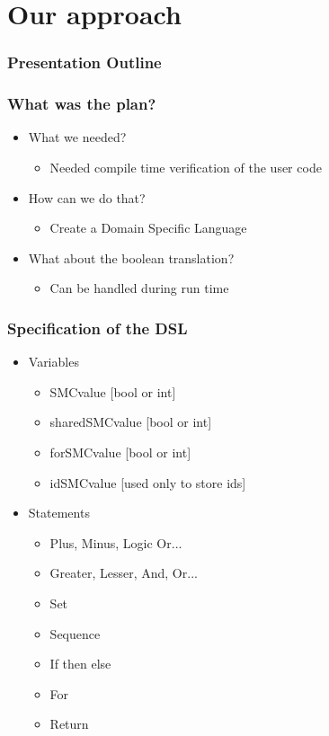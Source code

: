 \documentclass{beamer}
\begin{document}
\section{Our approach}
\begin{frame}[fragile]
\frametitle{Presentation Outline}
\tableofcontents[currentsection]
\end{frame}

\begin{frame}[fragile]
\frametitle{What was the plan?}
\begin{itemize}
\item What we needed?
\begin{itemize}
\item Needed compile time verification of the user code
\end{itemize}
\item How can we do that?
\begin{itemize}
\item Create a Domain Specific Language
\end{itemize}
\item What about the boolean translation?
\begin{itemize}
\item Can be handled during run time
\end{itemize}
\end{itemize}
\end{frame}


\begin{frame}[fragile]
\frametitle{Specification of the DSL}
\begin{itemize}
\item Variables
\begin{itemize}
\item SMCvalue [bool or int]
\item sharedSMCvalue [bool or int]
\item forSMCvalue [bool or int]
\item idSMCvalue [used only to store ids]
\end{itemize}
\item Statements
\begin{itemize}
\item Plus, Minus, Logic Or...
\item Greater, Lesser, And, Or...
\item Set
\item Sequence
\item If then else
\item For
\item Return
\end{itemize}
\end{itemize}
\end{frame}
\end{document}
